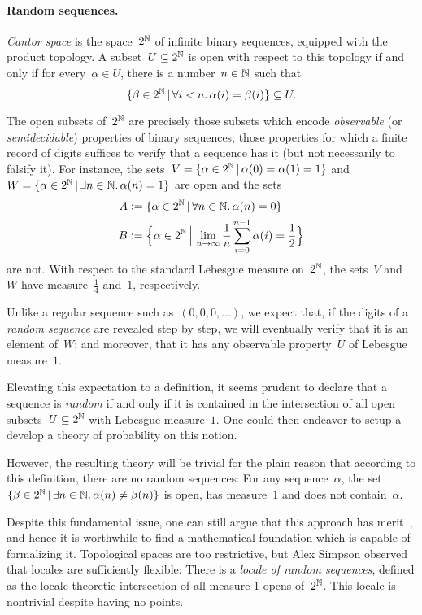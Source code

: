 \documentclass{ws-rv9x6}
\begin{document}
{\paragraph{Random sequences.} \emph{Cantor space} is the space~$2^{\mathbb{N}}$ of
infinite binary sequences, equipped with the product topology. A subset~$U
\subseteq 2^{\mathbb{N}}$ is open with respect to this topology if and only if for
every~$\alpha \in U$, there is a number~$n \in \mathbb{N}$ such that
\[ \{ \beta \in 2^{\mathbb{N}} \,|\, \forall i < n\mathpunct{.} \alpha(i) = \beta(i) \} \subseteq U. \]

The open subsets of~$2^{\mathbb{N}}$ are precisely those subsets which encode
\emph{observable} (or \emph{semidecidable}) properties of binary sequences,
those properties for which a finite record of digits suffices to verify that a
sequence has it (but not necessarily to falsify it). For instance, the sets~$V
= \{ \alpha \in 2^{\mathbb{N}} \,|\, \alpha(0) = \alpha(1) = 1 \}$ and~$W = \{
\alpha \in 2^{\mathbb{N}} \,|\, \exists n\in\mathbb{N}\mathpunct{.} \alpha(n) = 1 \}$ are open and the sets
\begin{align*}
  A &\vcentcolon= \{ \alpha \in 2^{\mathbb{N}} \,|\, \forall n\in\mathbb{N}\mathpunct{.} \alpha(n) = 0 \} \\
  B &\vcentcolon= \Bigl\{ \alpha \in 2^{\mathbb{N}} \,\Big|\, \lim_{n \to \infty} \frac{1}{n} \sum_{i=0}^{n-1} \alpha(i) = \frac{1}{2} \Bigr\}
\end{align*}
are not. With respect to the standard Lebesgue measure on~$2^{\mathbb{N}}$, the sets~$V$
and~$W$ have measure~$\frac{1}{4}$ and~$1$, respectively.

Unlike a regular sequence such as~$(0,0,0,\ldots)$, we expect that, if the
digits of a \emph{random sequence} are revealed step by step, we will
eventually verify that it is an element of~$W$; and moreover, that it has any
observable property~$U$ of Lebesgue measure~$1$.

Elevating this expectation to a definition, it seems prudent to declare that a
sequence is \emph{random} if and only if it is contained in the intersection of
all open subsets~$U \subseteq 2^{\mathbb{N}}$ with Lebesgue measure~$1$. One could then
endeavor to setup a develop a theory of probability on this notion.

However, the resulting theory will be trivial for the plain reason that
according to this definition, there are no random sequences: For any
sequence~$\alpha$, the set~$\{ \beta \in 2^{\mathbb{N}} \,|\, \exists n \in \mathbb{N}\mathpunct{.}
\alpha(n) \neq \beta(n) \}$ is open, has measure~$1$ and does not
contain~$\alpha$.

Despite this fundamental issue, one can still argue that this approach has
merit~\cite{simpson:measure}, and hence it is worthwhile to find a
mathematical foundation which is capable of formalizing it. Topological
spaces are too restrictive, but Alex Simpson observed that locales are
sufficiently flexible: There is a \emph{locale of random sequences}, defined as
the locale-theoretic intersection of all measure-$1$ opens of~$2^{\mathbb{N}}$. This
locale is nontrivial despite having no points.


}
\end{document}
